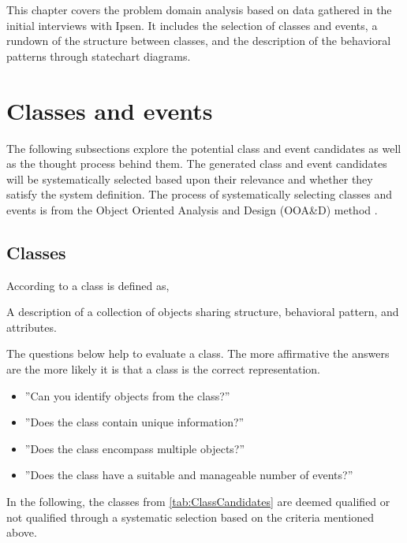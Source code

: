 This chapter covers the problem domain analysis based on data gathered in the initial interviews with Ipsen.
It includes the selection of classes and events, a rundown of the structure between classes, and the description of the behavioral patterns through statechart diagrams.

\section{Classes and events}\label{sec:ClassEvent}
The following subsections explore the potential class and event candidates as well as the thought process behind them.
The generated class and event candidates will be systematically selected based upon their relevance and whether they satisfy the system definition.
The process of systematically selecting classes and events is from the Object Oriented Analysis and Design (OOA\&D) method \cite{Rod-Aalborg}.

\subsection{Classes} \label{sec:Classes}
According to  \citep[p.~55]{Rod-Aalborg} a class is defined as,
\begin{defn}\label{defn:class}
	A description of a collection of objects sharing structure, behavioral pattern, and attributes.
\end{defn}

The questions below help to evaluate a class. The more affirmative the answers are the more likely it is that a class is the correct representation. \citep[p.~63]{Rod-Aalborg}
\begin{itemize}
	\item ''Can you identify objects from the class?''
	\item ''Does the class contain unique information?''
	\item ''Does the class encompass multiple objects?''
	\item ''Does the class have a suitable and manageable number of events?''
\end{itemize}

In the following, the classes from \cref{tab:ClassCandidates} are deemed qualified or not qualified through a systematic selection based on the criteria mentioned above.

